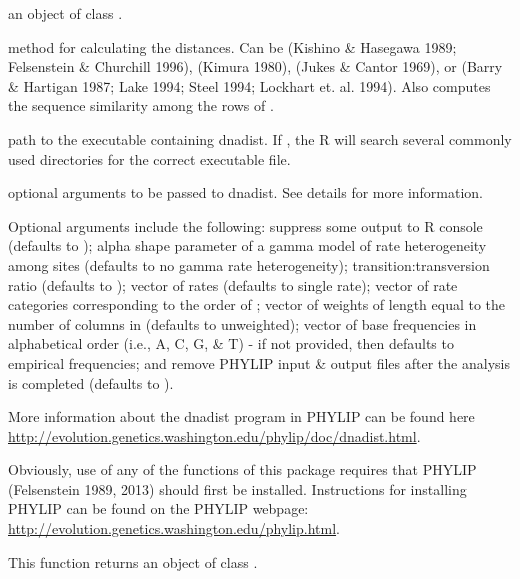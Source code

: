 \documentclass[a4paper]{book}
\begin{document}
\begin{Arguments}
\begin{ldescription}
\item[\code{X}] an object of class .
\item[\code{method}] method for calculating the distances. Can be  (Kishino \& Hasegawa 1989; Felsenstein \& Churchill 1996),  (Kimura 1980),  (Jukes \& Cantor 1969), or  (Barry \& Hartigan 1987; Lake 1994; Steel 1994; Lockhart et. al. 1994). Also  computes the sequence similarity among the rows of .
\item[\code{path}] path to the executable containing dnadist. If , the R will search several commonly used directories for the correct executable file.
\item[\code{...}] optional arguments to be passed to dnadist. See details for more information.
\end{ldescription}
\end{Arguments}
%
\begin{Details}\relax
Optional arguments include the following:  suppress some output to R console (defaults to );  alpha shape parameter of a gamma model of rate heterogeneity among sites (defaults to no gamma rate heterogeneity);  transition:transversion ratio (defaults to );  vector of rates (defaults to single rate);  vector of rate categories corresponding to the order of ;  vector of weights of length equal to the number of columns in  (defaults to unweighted);  vector of base frequencies in alphabetical order (i.e., A, C, G, \& T) - if not provided, then defaults to empirical frequencies; and  remove PHYLIP input \& output files after the analysis is completed (defaults to ).

More information about the dnadist program in PHYLIP can be found here \url{http://evolution.genetics.washington.edu/phylip/doc/dnadist.html}.

Obviously, use of any of the functions of this package requires that PHYLIP (Felsenstein 1989, 2013) should first be installed. Instructions for installing PHYLIP can be found on the PHYLIP webpage: \url{http://evolution.genetics.washington.edu/phylip.html}.
\end{Details}
%
\begin{Value}
This function returns an object of class .
\end{Value}
\end{document}
